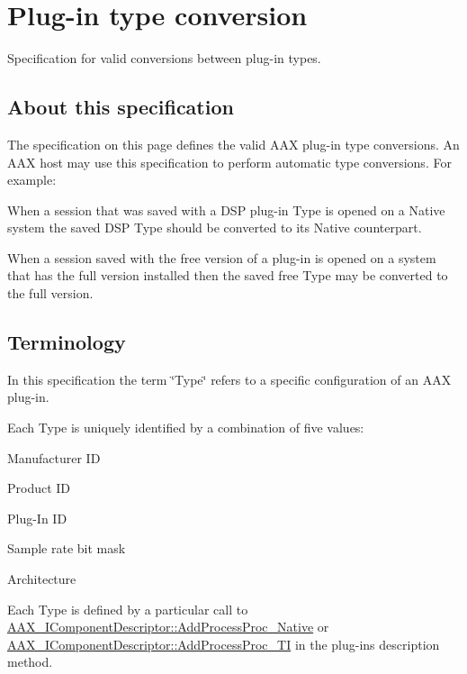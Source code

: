 \hypertarget{a00356}{}\section{Plug-\/in type conversion}
\label{a00356}
Specification for valid conversions between plug-\/in types. 

\hypertarget{a00356_advancedTopics_relatedTypes_about}{}\subsection{About this specification}\label{a00356_advancedTopics_relatedTypes_about}
The specification on this page defines the valid A\+A\+X plug-\/in type conversions. An A\+A\+X host may use this specification to perform automatic type conversions. For example\+: 
\begin{DoxyItemize}
\item When a session that was saved with a D\+S\+P plug-\/in Type is opened on a Native system the saved D\+S\+P Type should be converted to its Native counterpart.  
\item When a session saved with the free version of a plug-\/in is opened on a system that has the full version installed then the saved free Type may be converted to the full version.  
\end{DoxyItemize}\hypertarget{a00356_advancedTopics_relatedTypes_terminology}{}\subsection{Terminology}\label{a00356_advancedTopics_relatedTypes_terminology}
In this specification the term \char`\"{}\+Type\char`\"{} refers to a specific configuration of an A\+A\+X plug-\/in.

Each Type is uniquely identified by a combination of five values\+: 
\begin{DoxyItemize}
\item Manufacturer I\+D  
\item Product I\+D  
\item Plug-\/\+In I\+D  
\item Sample rate bit mask  
\item Architecture  
\end{DoxyItemize}

Each Type is defined by a particular call to \hyperlink{a00088_a1c069508cf54a523905c8160ebf628ad}{A\+A\+X\+\_\+\+I\+Component\+Descriptor\+::\+Add\+Process\+Proc\+\_\+\+Native} or \hyperlink{a00088_aa8443e720e48046444a2e9f712f0864b}{A\+A\+X\+\_\+\+I\+Component\+Descriptor\+::\+Add\+Process\+Proc\+\_\+\+T\+I} in the plug-\/in\textquotesingle{}s description method.

